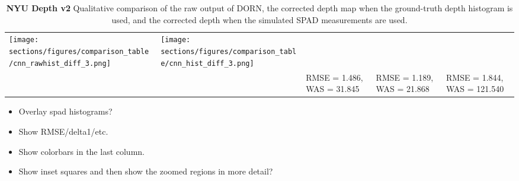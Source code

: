 \begin{table*}
\begin{center}
\begin{tabularx}{\linewidth}{*{5}{X}}
      \texttt{[image: sections/figures/comparison\_table/cnn\_rawhist\_diff\_3.png]} &
      \texttt{[image: sections/figures/comparison\_table/cnn\_hist\_diff\_3.png]} \\ 
  & & RMSE = 1.486, WAS = 31.845 & RMSE = 1.189, WAS = 21.868 & RMSE = 1.844, WAS = 121.540 \\
    \end{tabularx}
  \end{center}
  \caption{\textbf{NYU Depth v2} Qualitative comparison of the raw output of
    DORN, the corrected depth map when the ground-truth depth histogram is used,
    and the corrected depth when the simulated SPAD measurements are used.}
\end{table*}
\begin{itemize}
\item Overlay spad histograms?
\item Show RMSE/delta1/etc.
\item Show colorbars in the last column.
\item Show inset squares and then show the zoomed regions in more detail?
\end{itemize}


